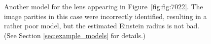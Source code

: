 \documentclass[12pt,preprint]{aastex}
\newcommand{\figref}[1]{Figure~\ref{fig:#1}}
\begin{document}
\begin{figure}
{  }

  \caption[result 7025 (ASW0000h2m)]{Another model for the lens
    appearing in \figref{fig:7022}.  The image parities in this case
    were incorrectly identified, resulting in a rather poor model, but
    the estimated Einstein radius is not bad. (See Section
    \ref{sec:example_models} for details.)}
  \label{fig:7025}
\end{figure}
  
\end{document}
